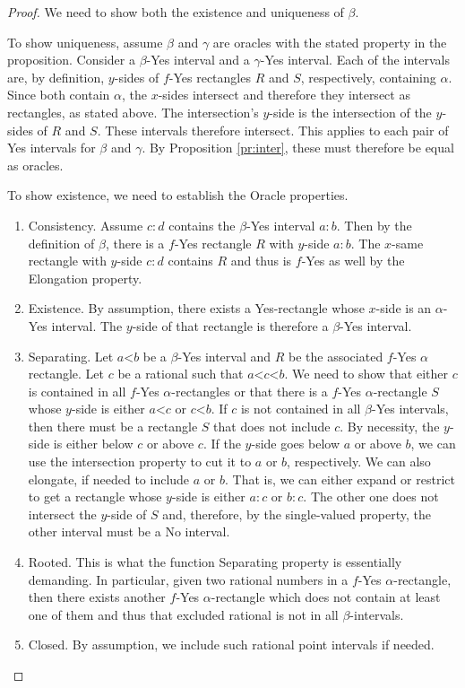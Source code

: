 \documentclass[12pt]{article}
\theoremstyle{remark}
\newcommand{\lt}{\mathord{<}}
\begin{document}
\begin{proof}
We need to show both the existence and uniqueness of $\beta$.

To show uniqueness, assume $\beta$ and $\gamma$ are oracles with the stated property in the proposition. Consider a $\beta$-Yes interval and a  $\gamma$-Yes interval. Each of the intervals are, by definition, $y$-sides of $f$-Yes rectangles $R$ and $S$, respectively, containing $\alpha$. Since both contain $\alpha$, the $x$-sides intersect and therefore they intersect as rectangles, as stated above. The intersection's $y$-side is the intersection of the $y$-sides of $R$ and $S$. These intervals therefore intersect. This applies to each pair of Yes intervals for $\beta$ and $\gamma$. By Proposition \ref{pr:inter}, these must therefore be equal as oracles. 

To show existence, we need to establish the Oracle properties. 

\begin{enumerate}
    \item Consistency. Assume $c:d$ contains the $\beta$-Yes interval $a:b$. Then by the definition of $\beta$, there is a $f$-Yes rectangle $R$ with $y$-side $a:b$. The $x$-same rectangle with $y$-side $c:d$ contains $R$ and thus is $f$-Yes as well by the Elongation property. 
    \item Existence. By assumption, there exists a Yes-rectangle whose $x$-side is an $\alpha$-Yes interval. The $y$-side of that rectangle is therefore a $\beta$-Yes interval. 
    \item Separating. Let $a \lt b$ be a $\beta$-Yes interval and $R$ be the associated $f$-Yes $\alpha$ rectangle. Let $c$ be a rational such that $a \lt c \lt b$. We need to show that either $c$ is contained in all $f$-Yes $\alpha$-rectangles or that there is a $f$-Yes $\alpha$-rectangle $S$ whose $y$-side is either $a \lt c$ or $c \lt b$. If $c$ is not contained in all $\beta$-Yes intervals, then there must be a rectangle $S$ that does not include $c$. By necessity, the $y$-side is either below $c$ or above $c$. If the $y$-side goes below $a$ or above $b$, we can use the intersection property to cut it to $a$ or $b$, respectively. We can also elongate, if needed to include $a$ or $b$.  That is, we can either expand or restrict to get a rectangle whose $y$-side is either $a:c$ or  $b:c$. The other one does not intersect the $y$-side of $S$ and, therefore, by the single-valued property, the other interval must be a No interval.  
    \item Rooted. This is what the function Separating property is essentially demanding. In particular, given two rational numbers in a $f$-Yes $\alpha$-rectangle, then there exists another $f$-Yes $\alpha$-rectangle which does not contain at least one of them and thus that excluded rational is not in all $\beta$-intervals. 
    \item Closed. By assumption, we include such rational point intervals if needed.  
\end{enumerate}

\end{proof}
\end{document}
